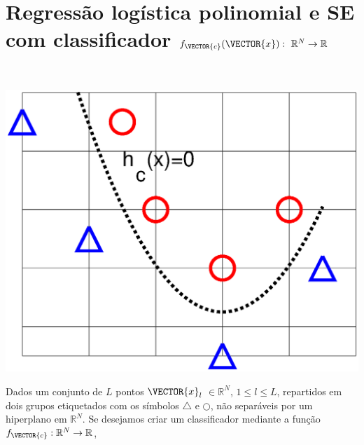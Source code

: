 \newpage

\section{Regressão logística polinomial e SE com classificador $f_{\VECTOR{c}}(\VECTOR{x}):~\mathbb{R}^{N} \rightarrow \mathbb{R}$}
\label{sec:theo:reglogrnr1poly:1}


\begin{theorem}\label{theo:reglogrnr1poly:1}
~\\
\noindent
\begin{minipage}{0.45\textwidth}
\centering
\includegraphics[width=0.95\linewidth]{chapters/classificacao/mfiles/reglogrnr1poly/reglogrnr1poly.eps} 
\end{minipage}
\begin{minipage}{0.55\textwidth}
Dados um conjunto de $L$ pontos
$\VECTOR{x}_l$ $\in \mathbb{R}^{N}$, $1\leq l \leq L$,
repartidos em dois grupos etiquetados com os símbolos $\bigtriangleup$ e $\bigcirc$,
não separáveis por um hiperplano  em $\mathbb{R}^{N}$.
Se desejamos criar um classificador mediante 
a função  $f_{\VECTOR{c}}:\mathbb{R}^{N} \rightarrow \mathbb{R}$,

\end{minipage}
\end{theorem}
